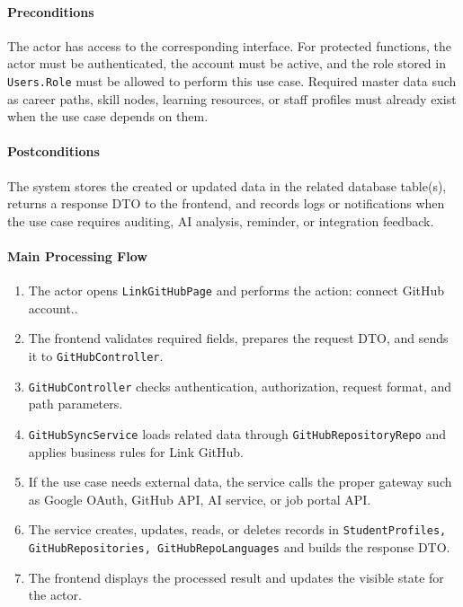 \paragraph{Preconditions}

The actor has access to the corresponding interface. For protected functions, the actor must be authenticated, the account must be active, and the role stored in \texttt{Users.Role} must be allowed to perform this use case. Required master data such as career paths, skill nodes, learning resources, or staff profiles must already exist when the use case depends on them.

\paragraph{Postconditions}

The system stores the created or updated data in the related database table(s), returns a response DTO to the frontend, and records logs or notifications when the use case requires auditing, AI analysis, reminder, or integration feedback.

\paragraph{Main Processing Flow}

\begin{enumerate}
    \item The actor opens \texttt{LinkGitHubPage} and performs the action: connect GitHub account..
    \item The frontend validates required fields, prepares the request DTO, and sends it to \texttt{GitHubController}.
    \item \texttt{GitHubController} checks authentication, authorization, request format, and path parameters.
    \item \texttt{GitHubSyncService} loads related data through \texttt{GitHubRepositoryRepo} and applies business rules for Link GitHub.
    \item If the use case needs external data, the service calls the proper gateway such as Google OAuth, GitHub API, AI service, or job portal API.
    \item The service creates, updates, reads, or deletes records in \texttt{StudentProfiles, GitHubRepositories, GitHubRepoLanguages} and builds the response DTO.
    \item The frontend displays the processed result and updates the visible state for the actor.
\end{enumerate}

